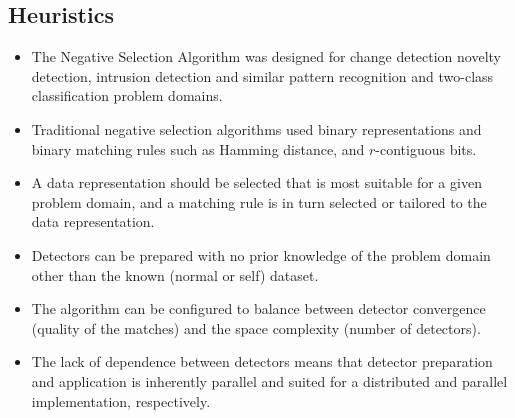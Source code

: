 \subsection{Heuristics}
\begin{itemize}
	\item The Negative Selection Algorithm was designed for change detection novelty detection, intrusion detection and similar pattern recognition and two-class classification problem domains.
	\item Traditional negative selection algorithms used binary representations and binary matching rules such as Hamming distance, and $r$-contiguous bits.
	\item A data representation should be selected that is most suitable for a given problem domain, and a matching rule is in turn selected or tailored to the data representation.
	\item Detectors can be prepared with no prior knowledge of the problem domain other than the known (normal or self) dataset. 
	\item The algorithm can be configured to balance between detector convergence (quality of the matches) and the space complexity (number of detectors).
	\item The lack of dependence between detectors means that detector preparation and application is inherently parallel and suited for a distributed and parallel implementation, respectively.
\end{itemize}

